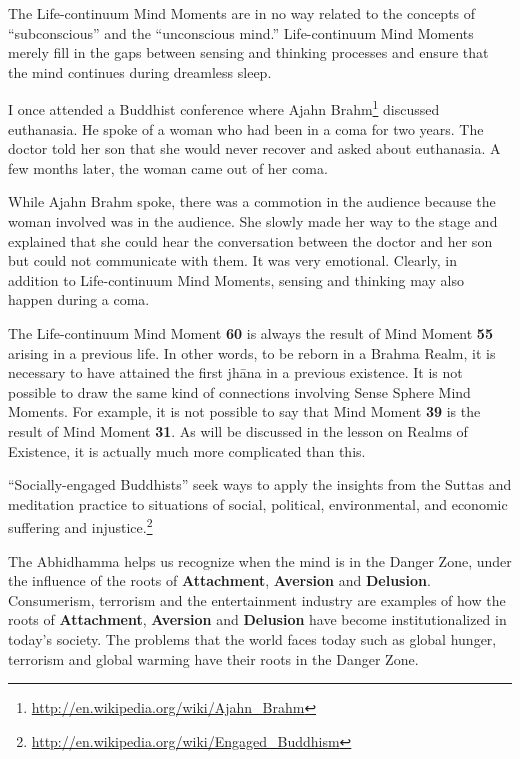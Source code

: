 The Life-continuum Mind Moments are in no way related to the concepts of “subconscious” and the “unconscious mind.” Life-continuum Mind Moments merely fill in the gaps between sensing and thinking processes and ensure that the mind continues during dreamless sleep. 


I once attended a Buddhist conference where Ajahn Brahm\footnote{\url{http://en.wikipedia.org/wiki/Ajahn_Brahm}} discussed euthanasia. He spoke of a woman who had been in a coma for two years. The doctor told her son that she would never recover and asked about euthanasia. A few months later, the woman came out of her coma. 

While Ajahn Brahm spoke, there was a commotion in the audience because the woman involved was in the audience. She slowly made her way to the stage and explained that she could hear the conversation between the doctor and her son but could not communicate with them. It was very emotional. Clearly, in addition to Life-continuum Mind Moments, sensing and thinking may also happen during a coma.

\pagebreak


The Life-continuum Mind Moment \textbf{60} is always the result of Mind Moment \textbf{55} arising in a previous life. In other words, to be reborn in a Brahma Realm, it is necessary to have attained the first jhāna in a previous existence. It is not possible to draw the same kind of connections involving Sense Sphere Mind Moments. For example, it is not possible to say that Mind Moment \textbf{39} is the result of Mind Moment \textbf{31}. As will be discussed in the lesson on Realms of Existence, it is actually much more complicated than this.


“Socially-engaged Buddhists” seek ways to apply the insights from the Suttas and meditation practice to situations of social, political, environmental, and economic suffering and injustice.\footnote{\url{http://en.wikipedia.org/wiki/Engaged_Buddhism}}

The Abhidhamma helps us recognize when the mind is in the Danger Zone, under the influence of the roots of \textbf{Attachment}, \textbf{Aversion} and \textbf{Delusion}. Consumerism, terrorism and the entertainment industry are examples of how the roots of \textbf{Attachment}, \textbf{Aversion} and \textbf{Delusion} have become institutionalized in today's society. The problems that the world faces today such as global hunger, terrorism and global warming have their roots in the Danger Zone.

